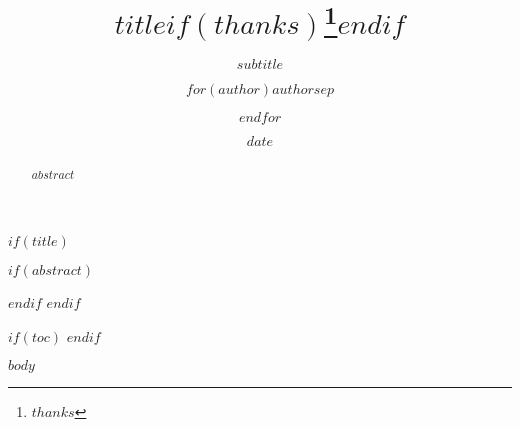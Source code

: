 \documentclass[12pt,a4paper]{extarticle}
\title{$title$$if(thanks)$\thanks{$thanks$}$endif$}
\subtitle{$subtitle$}
\author{$for(author)$$author$$sep$ \and $endfor$}
\date{$date$}
\begin{document}
$if(title)$
\maketitle
$if(abstract)$
\begin{abstract}
$abstract$
\end{abstract}
$endif$
$endif$

$if(toc)$
\setcounter{tocdepth}{$toc-depth$}
\tableofcontents
\clearpage
$endif$

$body$
\end{document}
